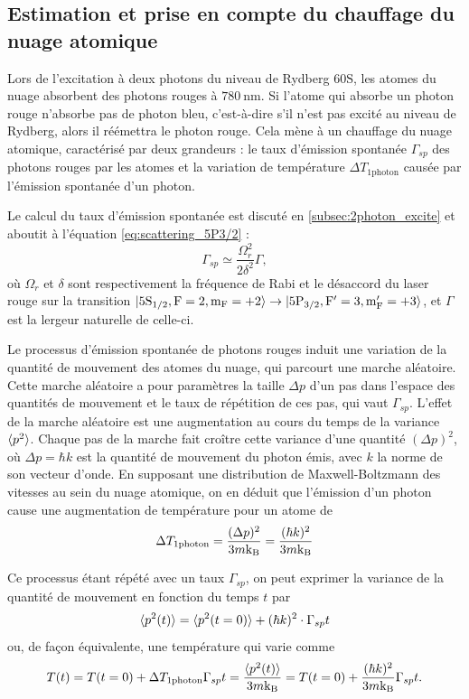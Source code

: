 	\subsection{Estimation et prise en compte du chauffage du nuage atomique}
\noindent Lors de l'excitation à deux photons du niveau de Rydberg $\mathrm{60S}$, les atomes du nuage absorbent des photons rouges à $\SI{780}{\nano\meter}$.
Si l'atome qui absorbe un photon rouge n'absorbe pas de photon bleu, c'est-à-dire s'il n'est pas excité au niveau de Rydberg, alors il réémettra le photon rouge.
Cela mène à un chauffage du nuage atomique, caractérisé par deux grandeurs :
le taux d'émission spontanée $\Gamma_{sp}$ des photons rouges par les atomes et la variation de température $\Delta T_{\text{1photon}}$ causée par l'émission spontanée d'un photon.

Le calcul du taux d'émission spontanée est discuté en \ref{subsec:2photon_excite} et aboutit à l'équation \eqref{eq:scattering_5P3/2} :
\begin{equation}
\label{eq:Gamma_sp}
\Gamma_{sp} \simeq \frac{\Omega_r^2}{2\delta^2}\Gamma,
\end{equation}
où $\Omega_r$ et $\delta$ sont respectivement la fréquence de Rabi et le désaccord du laser rouge sur la transition $\ket{\mathrm{5S_{1/2},F=2,m_F=+2}} \rightarrow \ket{\mathrm{5P_{3/2},F'=3,m_F'=+3}}$, et $\Gamma$ est la lergeur naturelle de celle-ci.

Le processus d'émission spontanée de photons rouges induit une variation de la quantité de mouvement des atomes du nuage, qui parcourt une marche aléatoire.
Cette marche aléatoire a pour paramètres la taille $\Delta p$ d'un pas dans l'espace des quantités de mouvement et le taux de répétition de ces pas, qui vaut $\Gamma_{sp}$.
L'effet de la marche aléatoire est une augmentation au cours du temps de la variance $\braket{p^2}$.
Chaque pas de la marche fait croître cette variance d'une quantité $(\Delta p)^2$, où $\Delta p = \hbar k$ est la quantité de mouvement du photon émis, avec $k$ la norme de son vecteur d'onde.
En supposant une distribution de Maxwell-Boltzmann des vitesses au sein du nuage atomique, on en déduit que l'émission d'un photon cause une augmentation de température pour un atome de
\begin{equation}
\label{eq:heating_1photon}
\Delta T_{\text{1photon}} = \frac{(\Delta p)^2}{3m\mathrm{k_B}} = \frac{(\hbar k)^2}{3m\mathrm{k_B}}
\end{equation}

Ce processus étant répété avec un taux $\Gamma_{sp}$, on peut exprimer la variance de la quantité de mouvement en fonction du temps $t$ par
\begin{equation}
\label{eq:momentum_randomwalk}
\braket{p^2 (t)} = \braket{p^2(t=0)} + (\hbar k)^2 \cdot \Gamma_{sp}t
\end{equation}
ou, de façon équivalente, une température qui varie comme
\begin{equation}
\label{eq:heating_randomwalk}
T(t) = T(t=0) + \Delta T_{\text{1photon}}\Gamma_{sp}t = \frac{\braket{p^2 (t)}}{3m\mathrm{k_B}} =
T(t=0) + \frac{(\hbar k)^2}{3m\mathrm{k_B}} \Gamma_{sp} t.
\end{equation}

